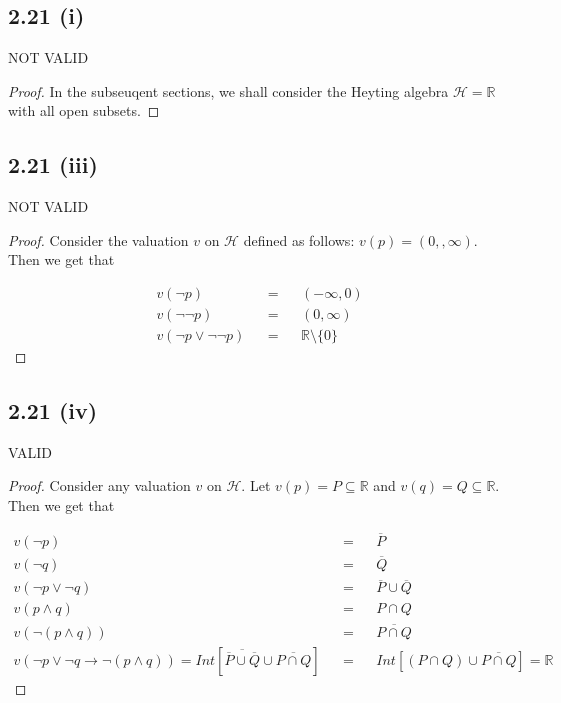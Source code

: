 \documentclass[12pt]{article}
\begin{document}
\subsection*{2.21 (i)} NOT VALID

\begin{proof}
In the subseuqent sections, we shall consider the Heyting algebra $\mathcal{H} = \mathbb{R}$ with all open subsets.

\end{proof}

\subsection*{2.21 (iii)} NOT VALID

\begin{proof}
Consider the valuation $v$ on $\mathcal{H}$ defined as follows: $v(p) = (0,,\infty)$. Then we get that 

\begin{align*}
    v(\neg p) &&=&& (-\infty, 0) \\
    v(\neg \neg p) &&=&& (0, \infty) \\
    v(\neg p \vee \neg \neg p) &&=&& \mathbb{R} \setminus \{0\}
\end{align*}

\end{proof}

\subsection*{2.21 (iv)} VALID

\begin{proof}
Consider any valuation $v$ on $\mathcal{H}$. Let $v(p) = P \subseteq \mathbb{R}$ and $v(q) = Q \subseteq \mathbb{R}$. Then we get that

\begin{align*}
    v(\neg p) && = && \overline{P} \\
    v(\neg q) && = && \overline{Q} \\
    v(\neg p \vee \neg q) && = && \overline{P} \cup \overline{Q} \\
    v(p \wedge q) && = && P \cap Q \\
    v(\neg (p \wedge q)) && = && \overline{P \cap Q} \\
    v(\neg p \vee \neg q \rightarrow \neg (p \wedge q)) = Int[\overline{\overline{P} \cup \overline{Q}} \cup \overline{P \cap Q}] && = && Int[(P \cap Q) \cup \overline{P \cap Q}] = \mathbb{R}
\end{align*}
\end{proof}
\end{document}
